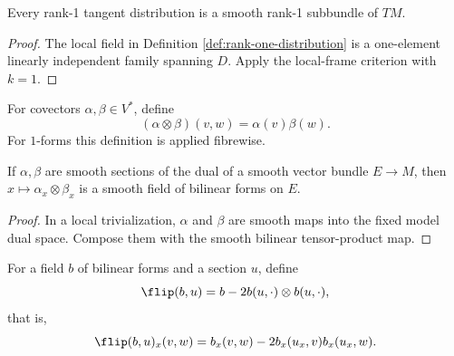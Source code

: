 \begin{proposition}
\label{prop:rank-one-distribution-is-subbundle}
\leanok
{}
Every rank-1 tangent distribution is a smooth rank-1 subbundle of $TM$.
\end{proposition}

\begin{proof}
\leanok
{}
\sketch The local field in Definition \ref{def:rank-one-distribution} is a
one-element linearly independent family spanning $D$. Apply the local-frame
criterion with $k=1$.
\end{proof}

\begin{definition}
\label{def:tensor-product-one-forms}
\leanok
For covectors $\alpha,\beta\in V^*$, define
\[
(\alpha\otimes\beta)(v,w)=\alpha(v)\beta(w).
\]
For $1$-forms this definition is applied fibrewise.
\end{definition}

\begin{lemma}
\label{lem:tensor-product-one-forms-smooth}
\leanok
{}
If $\alpha,\beta$ are smooth sections of the dual of a smooth vector bundle
$E\to M$, then $x\mapsto\alpha_x\otimes\beta_x$ is a smooth field of bilinear
forms on $E$.
\end{lemma}

\begin{proof}
\leanok
{}
\sketch In a local trivialization, $\alpha$ and $\beta$ are smooth maps into the
fixed model dual space. Compose them with the smooth bilinear tensor-product map.
\end{proof}

\begin{definition}
\label{def:sign-flipped-form}
\leanok
{}
For a field $b$ of bilinear forms and a section $u$, define
\[
\flip(b,u)=b-2b(u,\cdot)\otimes b(u,\cdot),
\]
that is,
\[
\flip(b,u)_x(v,w)=b_x(v,w)-2b_x(u_x,v)b_x(u_x,w).
\]
\end{definition}

